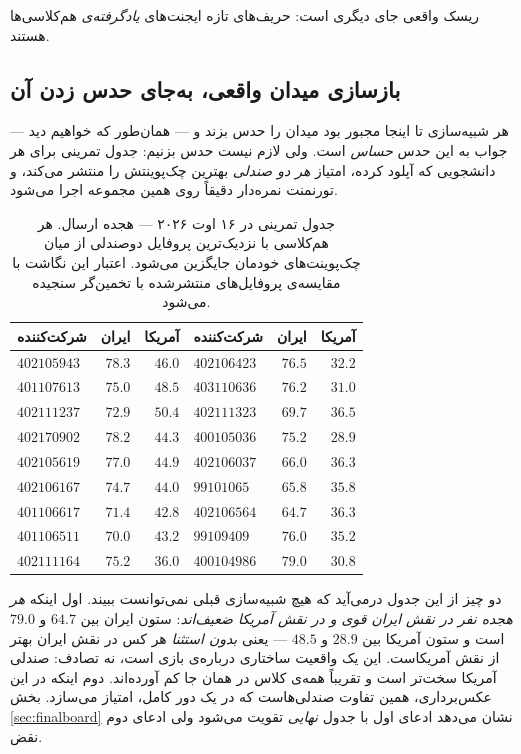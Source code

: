 \documentclass[12pt,a4paper]{article}
\begin{document}
ریسک واقعی جای دیگری است: حریف‌های تازه ایجنت‌های \emph{یادگرفته‌ی}
هم‌کلاسی‌ها هستند.

\subsection{بازسازی میدان واقعی، به‌جای حدس زدن آن}
\label{sec:classfield}

هر شبیه‌سازی تا اینجا مجبور بود میدان را حدس بزند و — همان‌طور که خواهیم
دید — جواب به این حدس \emph{حساس} است. ولی لازم نیست حدس بزنیم: جدول
تمرینی برای هر دانشجویی که آپلود کرده، امتیاز \emph{هر دو صندلی} بهترین
چک‌پوینتش را منتشر می‌کند، و تورنمنت نمره‌دار دقیقاً روی همین مجموعه اجرا
می‌شود.

\begin{table}[h]\centering\small
\begin{tabular}{lrr@{\qquad}lrr}
\toprule
شرکت‌کننده & ایران & آمریکا & شرکت‌کننده & ایران & آمریکا\\
\midrule
$402105943$ & $78.3$ & $46.0$ & $402106423$ & $76.5$ & $32.2$\\
$401107613$ & $75.0$ & $48.5$ & $403110636$ & $76.2$ & $31.0$\\
$402111237$ & $72.9$ & $50.4$ & $402111323$ & $69.7$ & $36.5$\\
$402170902$ & $78.2$ & $44.3$ & $400105036$ & $75.2$ & $28.9$\\
$402105619$ & $77.0$ & $44.9$ & $402106037$ & $66.0$ & $36.3$\\
$402106167$ & $74.7$ & $44.0$ & $99101065$ & $65.8$ & $35.8$\\
$401106617$ & $71.4$ & $42.8$ & $402106564$ & $64.7$ & $36.3$\\
$401106511$ & $70.0$ & $43.2$ & $99109409$  & $76.0$ & $35.2$\\
$402111164$ & $75.2$ & $36.0$ & $400104986$ & $79.0$ & $30.8$\\
\bottomrule
\end{tabular}
\caption{جدول تمرینی در ۱۶ اوت ۲۰۲۶ — هجده ارسال. هر هم‌کلاسی با
نزدیک‌ترین پروفایل دو‌صندلی از میان چک‌پوینت‌های خودمان جایگزین می‌شود.
اعتبار این نگاشت با مقایسه‌ی پروفایل‌های منتشرشده با تخمین‌گر سنجیده می‌شود.}
\end{table}

دو چیز از این جدول درمی‌آید که هیچ شبیه‌سازی قبلی نمی‌توانست ببیند. اول
اینکه \emph{هر هجده نفر در نقش ایران قوی و در نقش آمریکا ضعیف‌اند}: ستون ایران بین
$64.7$ و $79.0$ است و ستون آمریکا بین $28.9$ و $48.5$ — یعنی
\emph{بدون استثنا} هر کس در نقش ایران بهتر از نقش آمریکاست. این یک
واقعیت ساختاری درباره‌ی بازی است، نه تصادف: صندلی آمریکا سخت‌تر است و
تقریباً همه‌ی کلاس در همان جا کم آورده‌اند. دوم اینکه در این عکس‌برداری،
همین تفاوت صندلی‌هاست که در یک دور کامل، امتیاز می‌سازد. بخش~
\ref{sec:finalboard} نشان
می‌دهد ادعای اول با جدول \emph{نهایی} تقویت می‌شود ولی ادعای دوم نقض.
\end{document}
